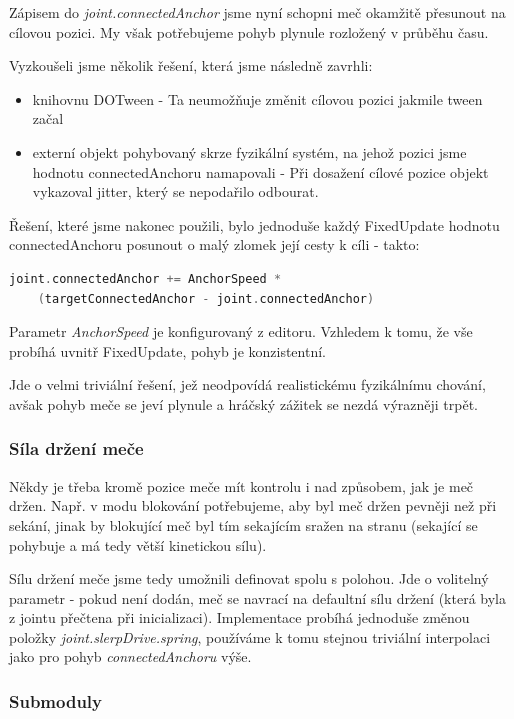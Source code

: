 Zápisem do \textit{joint.connectedAnchor} jsme nyní schopni meč okamžitě přesunout na cílovou pozici. My však potřebujeme pohyb plynule rozložený v průběhu času. 

Vyzkoušeli jsme několik řešení, která jsme následně zavrhli:
\begin{itemize}
  \item knihovnu DOTween - Ta neumožňuje změnit cílovou pozici jakmile tween začal
  \item externí objekt pohybovaný skrze fyzikální systém, na jehož pozici jsme hodnotu connectedAnchoru namapovali - Při dosažení cílové pozice objekt vykazoval jitter, který se nepodařilo odbourat.
\end{itemize}
Řešení, které jsme nakonec použili, bylo jednoduše každý FixedUpdate hodnotu connectedAnchoru posunout o malý zlomek její cesty k cíli - takto: 
\begin{lstlisting}[language=C, basicstyle=\fontsize{11}{13}\selectfont\ttfamily]
  joint.connectedAnchor += AnchorSpeed *
    (targetConnectedAnchor - joint.connectedAnchor) 
\end{lstlisting}
Parametr \textit{AnchorSpeed} je konfigurovaný z editoru. Vzhledem k tomu, že vše probíhá uvnitř FixedUpdate, pohyb je konzistentní.

Jde o velmi triviální řešení, jež neodpovídá realistickému fyzikálnímu chování, avšak pohyb meče se jeví plynule a hráčský zážitek se nezdá výrazněji trpět.

\subsubsection*{Síla držení meče}

Někdy je třeba kromě pozice meče mít kontrolu i nad způsobem, jak je meč držen. Např. v modu blokování potřebujeme, aby byl meč držen pevněji než při sekání, jinak by blokující meč byl tím sekajícím sražen na stranu (sekající se pohybuje a má tedy větší kinetickou sílu). 

Sílu držení meče jsme tedy umožnili definovat spolu s polohou. Jde o volitelný parametr - pokud není dodán, meč se navrací na defaultní sílu držení (která byla z jointu přečtena při inicializaci). Implementace probíhá jednoduše změnou položky \textit{joint.slerpDrive.spring}, používáme k tomu stejnou triviální interpolaci jako pro pohyb \textit{connectedAnchoru} výše.

\subsubsection*{Submoduly}

